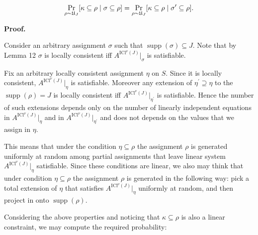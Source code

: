 \documentclass[10pt,a4paper]{article}
\begin{document}
\[\begin{gathered}
\Pr\limits_{\rho\sim\mathfrak{U}_{J}}[\kappa\subseteq\rho\mid\sigma\subseteq%
\rho]=\Pr\limits_{\rho\sim\mathfrak{U}_{J}}[\kappa\subseteq\rho\mid\sigma^{%
\prime}\subseteq\rho].
\end{gathered}\]






\par\medskip\noindent\textbf{Proof.}\par




Consider an arbitrary assignment $\sigma$ such that $\operatorname*{supp}(\sigma)\subseteq J$. Note that by Lemma
12 $\sigma$ is locally consistent iff $A^{\mathrm{ICl}^{\nu}\left(J\right)}|_{\sigma}$ is
satisfiable.\par




Fix an arbitrary locally consistent assignment $\eta$ on $S$. Since it is locally consistent,
$A^{\mathrm{ICl}^{\nu}\left(J\right)}|_{\eta}$ is satisfiable. Moreover any extension of $\eta^{\prime}\supseteq\eta$ to the
$\operatorname*{supp}(\rho)=J$ is locally consistent iff $A^{\mathrm{ICl}^{\nu}\left(J\right)}|_{\eta^{\prime}}$ is satisfiable. Hence the
number of such extensions depends only on the number of linearly independent equations in
$A^{\mathrm{ICl}^{\nu}\left(J\right)}|_{\eta}$ and in $A^{\mathrm{ICl}^{\nu}\left(J\right)}|_{\eta^{\prime}}$ and does not depends on the values
that we assign in $\eta$.\par




This means that under the condition $\eta\subseteq\rho$ the assignment $\rho$ is
generated uniformly at random among partial assignments that leave linear system
$A^{\mathrm{ICl}^{\nu}\left(J\right)}|_{\eta}$ satisfiable. Since these conditions are linear, we also may think that
under condition $\eta\subseteq\rho$ the assignment $\rho$ is generated in the following way: pick a
total extension of $\eta$ that satisfies $A^{\mathrm{ICl}^{\nu}\left(J\right)}|_{\eta}$ uniformly at random, and then
project in onto $\operatorname*{supp}(\rho)$.\par




Considering the above properties and noticing that $\kappa\subseteq\rho$ is also a linear
constraint, we may compute the required probability:\par
\end{document}
